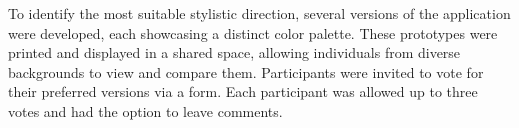 To identify the most suitable stylistic direction, several versions of the application were developed, each showcasing a distinct color palette. These prototypes were printed and displayed in a shared space, allowing individuals from diverse backgrounds to view and compare them. Participants were invited to vote for their preferred versions via a form. Each participant was allowed up to three votes and had the option to leave comments.